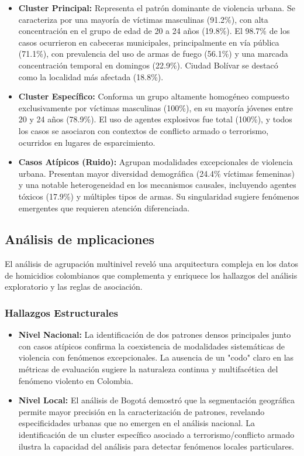 \documentclass[lettersize,journal]{IEEEtran}
\begin{document}
\begin{itemize}
    \item \textbf{Cluster Principal:} Representa el patrón dominante de violencia urbana. Se caracteriza por una mayoría de víctimas masculinas (91.2\%), con alta concentración en el grupo de edad de 20 a 24 años (19.8\%). El 98.7\% de los casos ocurrieron en cabeceras municipales, principalmente en vía pública (71.1\%), con prevalencia del uso de armas de fuego (56.1\%) y una marcada concentración temporal en domingos (22.9\%). Ciudad Bolívar se destacó como la localidad más afectada (18.8\%).

    \item \textbf{Cluster Específico:} Conforma un grupo altamente homogéneo compuesto exclusivamente por víctimas masculinas (100\%), en su mayoría jóvenes entre 20 y 24 años (78.9\%). El uso de agentes explosivos fue total (100\%), y todos los casos se asociaron con contextos de conflicto armado o terrorismo, ocurridos en lugares de esparcimiento.

    \item \textbf{Casos Atípicos (Ruido):} Agrupan modalidades excepcionales de violencia urbana. Presentan mayor diversidad demográfica (24.4\% víctimas femeninas) y una notable heterogeneidad en los mecanismos causales, incluyendo agentes tóxicos (17.9\%) y múltiples tipos de armas. Su singularidad sugiere fenómenos emergentes que requieren atención diferenciada.
\end{itemize}


\subsection{Análisis de mplicaciones}
El análisis de agrupación multinivel reveló una arquitectura compleja en los datos de homicidios colombianos que complementa y enriquece los hallazgos del análisis exploratorio y las reglas de asociación.

\subsubsection{Hallazgos Estructurales}

\begin{itemize}
    \item \textbf{Nivel Nacional:} La identificación de dos patrones densos principales junto con casos atípicos confirma la coexistencia de modalidades sistemáticas de violencia con fenómenos excepcionales. La ausencia de un "codo" claro en las métricas de evaluación sugiere la naturaleza continua y multifacética del fenómeno violento en Colombia.
    
    \item \textbf{Nivel Local:} El análisis de Bogotá demostró que la segmentación geográfica permite mayor precisión en la caracterización de patrones, revelando especificidades urbanas que no emergen en el análisis nacional. La identificación de un cluster específico asociado a terrorismo/conflicto armado ilustra la capacidad del análisis para detectar fenómenos locales particulares.
\end{itemize}
\end{document}
